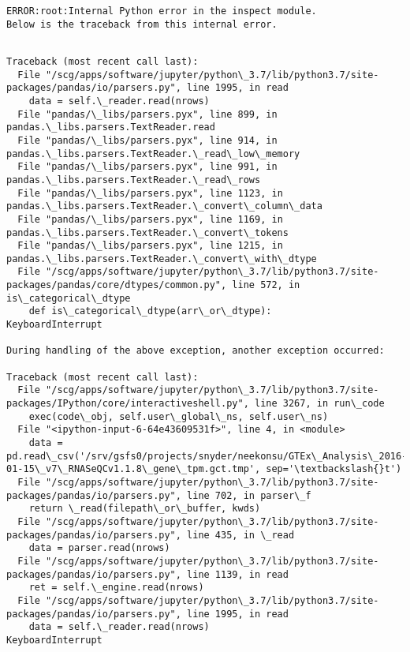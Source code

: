 \documentclass[11pt]{article}
\begin{document}
    \begin{Verbatim}[commandchars=\\\{\}]
ERROR:root:Internal Python error in the inspect module.
Below is the traceback from this internal error.


    \end{Verbatim}

    \begin{Verbatim}[commandchars=\\\{\}]
Traceback (most recent call last):
  File "/scg/apps/software/jupyter/python\_3.7/lib/python3.7/site-packages/pandas/io/parsers.py", line 1995, in read
    data = self.\_reader.read(nrows)
  File "pandas/\_libs/parsers.pyx", line 899, in pandas.\_libs.parsers.TextReader.read
  File "pandas/\_libs/parsers.pyx", line 914, in pandas.\_libs.parsers.TextReader.\_read\_low\_memory
  File "pandas/\_libs/parsers.pyx", line 991, in pandas.\_libs.parsers.TextReader.\_read\_rows
  File "pandas/\_libs/parsers.pyx", line 1123, in pandas.\_libs.parsers.TextReader.\_convert\_column\_data
  File "pandas/\_libs/parsers.pyx", line 1169, in pandas.\_libs.parsers.TextReader.\_convert\_tokens
  File "pandas/\_libs/parsers.pyx", line 1215, in pandas.\_libs.parsers.TextReader.\_convert\_with\_dtype
  File "/scg/apps/software/jupyter/python\_3.7/lib/python3.7/site-packages/pandas/core/dtypes/common.py", line 572, in is\_categorical\_dtype
    def is\_categorical\_dtype(arr\_or\_dtype):
KeyboardInterrupt

During handling of the above exception, another exception occurred:

Traceback (most recent call last):
  File "/scg/apps/software/jupyter/python\_3.7/lib/python3.7/site-packages/IPython/core/interactiveshell.py", line 3267, in run\_code
    exec(code\_obj, self.user\_global\_ns, self.user\_ns)
  File "<ipython-input-6-64e43609531f>", line 4, in <module>
    data = pd.read\_csv('/srv/gsfs0/projects/snyder/neekonsu/GTEx\_Analysis\_2016-01-15\_v7\_RNASeQCv1.1.8\_gene\_tpm.gct.tmp', sep='\textbackslash{}t')
  File "/scg/apps/software/jupyter/python\_3.7/lib/python3.7/site-packages/pandas/io/parsers.py", line 702, in parser\_f
    return \_read(filepath\_or\_buffer, kwds)
  File "/scg/apps/software/jupyter/python\_3.7/lib/python3.7/site-packages/pandas/io/parsers.py", line 435, in \_read
    data = parser.read(nrows)
  File "/scg/apps/software/jupyter/python\_3.7/lib/python3.7/site-packages/pandas/io/parsers.py", line 1139, in read
    ret = self.\_engine.read(nrows)
  File "/scg/apps/software/jupyter/python\_3.7/lib/python3.7/site-packages/pandas/io/parsers.py", line 1995, in read
    data = self.\_reader.read(nrows)
KeyboardInterrupt


\end{Verbatim}
\end{document}
